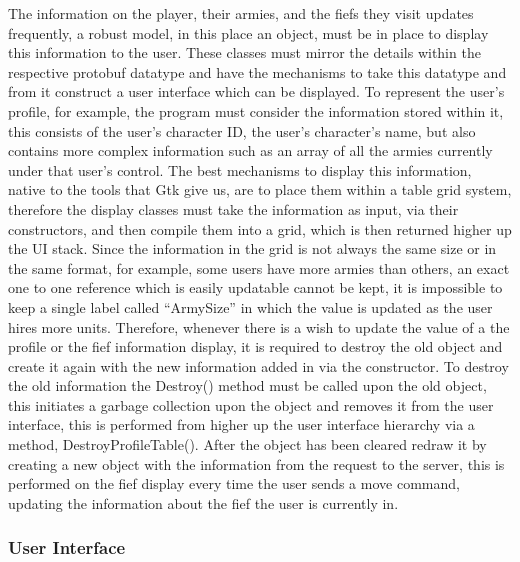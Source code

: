\documentclass{article}
\begin{document}
The information on the player, their armies, and the fiefs they visit updates frequently, a robust model, in this place an object, must be in place to display this information to the user. These classes must mirror the details within the respective protobuf datatype and have the mechanisms to take this datatype and from it construct a user interface which can be displayed. To represent the user’s profile, for example, the program must consider the information stored within it, this consists of the user’s character ID, the user’s character’s name, but also contains more complex information such as an array of all the armies currently under that user’s control. The best mechanisms to display this information, native to the tools that Gtk give us, are to place them within a table grid system, therefore the display classes must take the information as input, via their constructors, and then compile them into a grid, which is then returned higher up the UI stack. Since the information in the grid is not always the same size or in the same format, for example, some users have more armies than others,  an exact one to one reference which is easily updatable cannot be kept, it is impossible to keep a single label called “ArmySize” in which the value is updated as the user hires more units. Therefore, whenever there is a wish to update the value of a the profile or the fief information display, it is required to destroy the old object and create it again with the new information added in via the constructor. To destroy the old information the Destroy() method must be called upon the old object, this initiates a garbage collection upon the object and removes it from the user interface, this is performed from higher up the user interface hierarchy via a method, DestroyProfileTable(). After the object has been cleared redraw it by creating a new object with the information from the request to the server, this is performed on the fief display every time the user sends a move command, updating the information about the fief the user is currently in.

\subsubsection{User Interface}
\end{document}

